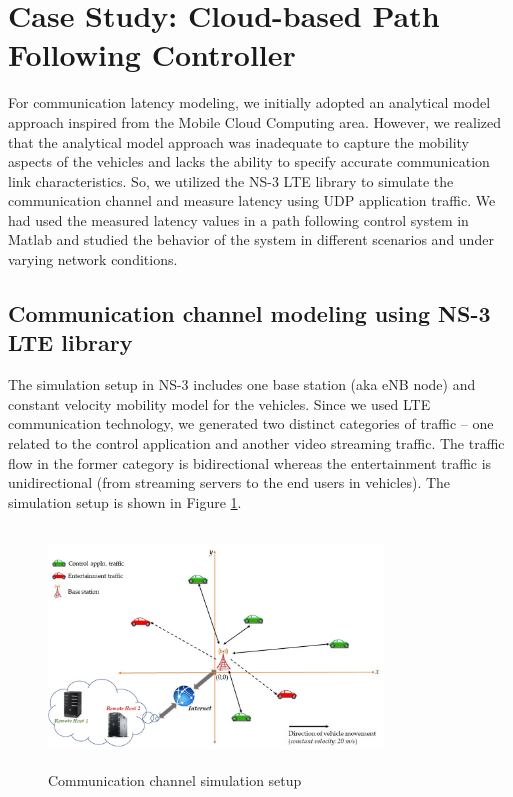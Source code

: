 \section{Case Study: Cloud-based Path Following Controller}
\label{sec:case_study}
For communication latency modeling, we initially adopted an analytical model approach inspired from the Mobile Cloud Computing area. However, we realized that the analytical model approach was inadequate to capture the mobility aspects of the vehicles and lacks the ability to specify accurate communication link characteristics. So, we utilized the NS-3 LTE library \cite{ref:ns3_lte} to simulate the communication channel and measure latency using UDP application traffic. We had used the measured latency values in a path following control system in Matlab and studied the behavior of the system in different scenarios and under varying network conditions.

\subsection{Communication channel modeling using NS-3 LTE library}
\label{sec:ns3_lte}
The simulation setup in NS-3 includes one base station (aka eNB node) and constant velocity mobility model for the vehicles. Since we used LTE communication technology, we generated two distinct categories of traffic – one related to the control application and another video streaming traffic. The traffic flow in the former category is bidirectional whereas the entertainment traffic is unidirectional (from streaming servers to the end users in vehicles). The simulation setup is shown in Figure \ref{fig:NS3-SETUP}. 
\begin{figure}
\includegraphics[width=3.5in,height=2.5in]{ns3_setup.jpg}
 \caption{Communication channel simulation setup  \label{fig:NS3-SETUP}}
\end{figure}

